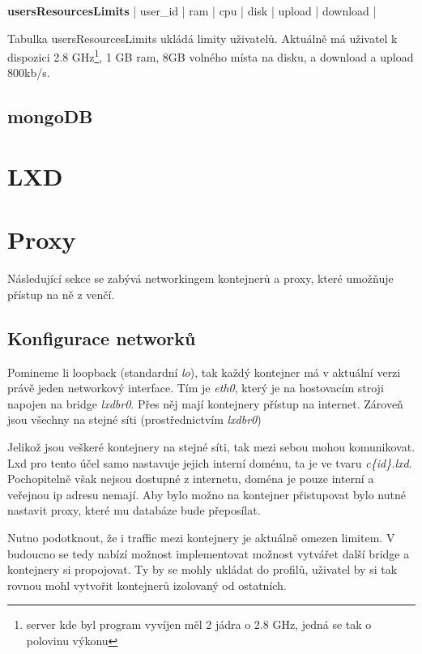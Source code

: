 \documentclass[a4paper,oneside,12pt]{report}
\begin{document}
\vspace{0.3cm}
\noindent
\textbf{usersResourcesLimits} | user\_id | ram | cpu | disk | upload | download |

Tabulka usersResourcesLimits ukládá limity uživatelů.
Aktuálně má uživatel k dispozici 2.8 GHz\footnote{server kde byl program vyvíjen měl 2 jádra o 2.8 GHz, jedná se tak o polovinu výkonu}, 1 GB ram, 8GB volného místa na disku, a download a upload 800kb/s.

\subsection{mongoDB}


\section{LXD}

\section{Proxy}

Následující sekce se zabývá networkingem kontejnerů a proxy, které umožňuje přístup na ně z venčí.

\subsection{Konfigurace networků}

Pomineme li loopback (standardní \textit{lo}), tak každý kontejner má v aktuální verzi právě jeden networkový interface.
Tím je \textit{eth0}, který je na hostovacím stroji napojen na bridge \textit{lxdbr0}.
Přes něj mají kontejnery přístup na internet.
Zároveň jsou všechny na stejné síti (prostřednictvím \textit{lxdbr0})

Jelikož jsou veškeré kontejnery na stejné síti, tak mezi sebou mohou komunikovat.
Lxd pro tento účel samo nastavuje jejich interní doménu, ta je ve tvaru \textit{c\{id\}.lxd}.
Pochopitelně však nejsou dostupné z internetu, doména je pouze interní a veřejnou ip adresu nemají.
Aby bylo možno na kontejner přistupovat bylo nutné nastavit proxy, které mu databáze bude přeposílat.

Nutno podotknout, že i traffic mezi kontejnery je aktuálně omezen limitem.
V budoucno se tedy nabízí možnost implementovat možnost vytvářet další bridge a kontejnery si propojovat.
Ty by se mohly ukládat do profilů, uživatel by si tak rovnou mohl vytvořit kontejnerů izolovaný od ostatních.
\end{document}
